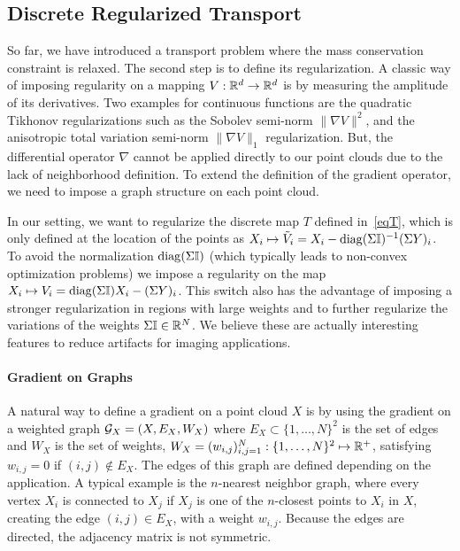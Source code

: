 \subsection{Discrete Regularized Transport} 
\label{sec:regsymme}

So far, we have introduced a transport problem where the mass conservation constraint is relaxed. The second step is to define its regularization. A classic way of imposing regularity on a mapping $V: \mathbb{R}^d \rightarrow \mathbb{R}^d$ is by measuring the amplitude of its derivatives. Two examples for continuous functions are the quadratic Tikhonov regularizations such as the Sobolev semi-norm $\|\nabla V\|^2$, and the anisotropic total variation semi-norm $\|\nabla V\|_1$ regularization. But, the differential operator $\nabla$  cannot be applied directly to our point clouds due to the lack of neighborhood definition. To extend the definition of the gradient operator, we need to impose a graph structure on each point cloud.

In our setting, we want to regularize the discrete map $T$ defined in~\eqref{eqT}, which is only defined at the location of the points as $X_i \mapsto \tilde{V}_i=X_i - \diag(\Sig \U)^{-1} (\Sig Y)_i $.  To avoid the normalization $\diag(\Sig \U)$ (which typically leads to non-convex optimization problems) we impose a regularity on the map $X_i \mapsto V_i = \diag(\Sig \U)X_i-(\Sigma Y)_i$. This switch also has the advantage of imposing a stronger regularization in regions with large weights and to further regularize the variations of the weights $\Sigma \mathbb{I} \in \mathbb{R}^N$. We believe these are actually interesting features to reduce artifacts for imaging applications. 

\paragraph{Gradient on Graphs}

A natural way to define a gradient on a point cloud $X$ is by using  the gradient on a weighted graph $\mathcal{G}_X = (X,E_X,W_X)$ where $E_X \subset \{1,\ldots,N\}^2$ is the set of edges and $W_X$ is the set of weights, $W_X = (w_{i,j})_{i,j=1}^N:  \{1,\ldots,N\}^2 \mapsto \mathbb{R}^+$, satisfying $w_{i,j}=0$ if $(i,j) \notin E_X$. The edges of this graph are defined depending on the application. A typical example is the $n$-nearest neighbor graph, where every vertex $X_i$ is connected to $X_j$ if $X_j$ is one of the $n$-closest points to $X_i$ in $X$, creating the edge $(i,j) \in E_X$, with a weight $w_{i,j}$. Because the edges are directed, the adjacency matrix is not symmetric. 

